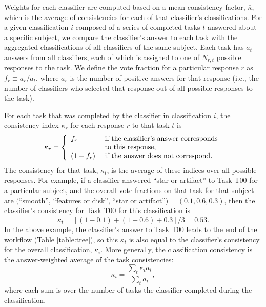 \documentclass[useAMS,usenatbib]{mn2e}
\def\kappamean {$\overline{\kappa}$}
\begin{document}
{Weights for each classifier are computed based on a mean consistency factor, \kappamean , which is the average of consistencies for each of that classifier's classifications. For a given classification $i$ composed of a series of completed tasks $t$ answered about a specific subject, we compare the classifier's answer to each task with the aggregated classifications of all classifiers of the same subject. Each task has $a_t$ answers from all classifiers, each of which is assigned to one of $N_{r,t}$ possible responses to the task. We define the vote fraction for a particular response $r$ as $f_r \equiv a_r/a_t$, where $a_r$ is the number of positive answers for that response (i.e., the number of classifiers who selected that response out of all possible responses to the task).

For each task that was completed by the classifier in classification $i$, the consistency index $\kappa_r$ for each response $r$ to that task $t$ is 
\begin{equation}
    \kappa_r = \left\{
    \begin{array}{l l}
      f_r       & \text{ if the classifier's answer corresponds} \\
                  & \text{ to this response,}\\
      (1 - f_r) & \text{ if the answer does not correspond.}\\
    \end{array} \right.
    \label{eqn-consistency-r}
 \end{equation}
The consistency for that task, $\kappa_t$, is the average of these indices over all possible responses. For example, if a classifier answered ``star or artifact'' to Task T00 for a particular subject, and the overall vote fractions on that task for that subject are $($``smooth'', ``features or disk'', ``star or artifact''$) = (0.1, 0.6, 0.3)$, then the classifier's consistency for Task T00 for this classification is
$$
\kappa_t = \left[\left(1 - 0.1\right) + \left(1 - 0.6\right) + 0.3\right]/3 = 0.5\overline{3}.
$$
In the above example, the classifier's answer to Task T00 leads to the end of the workflow (Table \ref{table:tree}), so this $\kappa_t$ is also equal to the classifier's consistency for the overall classification, $\kappa_i$. More generally, the classification consistency is the answer-weighted average of the task consistencies:
\begin{equation}
\kappa_i = \frac{\sum\limits_t \kappa_t a_t}{\sum\limits_t a_t} ,
\label{eqn-consistency-i}
\end{equation}
where each sum is over the number of tasks the classifier completed during the classification.

}
\end{document}
